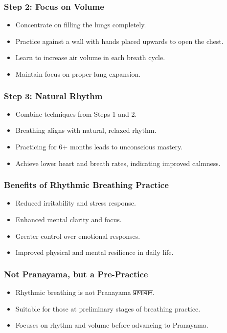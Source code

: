 \begin{frame}[fragile]\frametitle{Step 2: Focus on Volume}
    \begin{itemize}
        \item Concentrate on filling the lungs completely.
        \item Practice against a wall with hands placed upwards to open the chest.
        \item Learn to increase air volume in each breath cycle.
        \item Maintain focus on proper lung expansion.
    \end{itemize}
\end{frame}

\begin{frame}[fragile]\frametitle{Step 3: Natural Rhythm}
    \begin{itemize}
        \item Combine techniques from Steps 1 and 2.
        \item Breathing aligns with natural, relaxed rhythm.
        \item Practicing for 6+ months leads to unconscious mastery.
        \item Achieve lower heart and breath rates, indicating improved calmness.
    \end{itemize}
\end{frame}

\begin{frame}[fragile]\frametitle{Benefits of Rhythmic Breathing Practice}
    \begin{itemize}
        \item Reduced irritability and stress response.
        \item Enhanced mental clarity and focus.
        \item Greater control over emotional responses.
        \item Improved physical and mental resilience in daily life.
    \end{itemize}
\end{frame}

\begin{frame}[fragile]\frametitle{Not Pranayama, but a Pre-Practice}
    \begin{itemize}
        \item Rhythmic breathing is not Pranayama प्राणायाम.
        \item Suitable for those at preliminary stages of breathing practice.
        \item Focuses on rhythm and volume before advancing to Pranayama.
    \end{itemize}
\end{frame}

